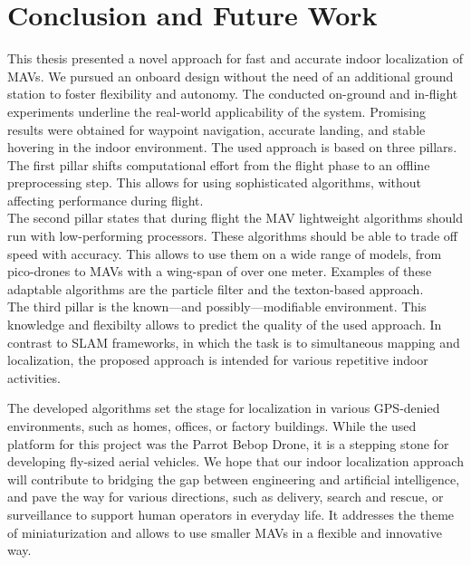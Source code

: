 \chapter{Conclusion and Future Work}
\label{chap:conclusion}

This thesis presented a novel approach for fast and accurate indoor
localization of MAVs. We pursued an onboard design without the need of
an additional ground station to foster flexibility and autonomy. The
conducted on-ground and in-flight experiments underline the real-world
applicability of the system. Promising results were obtained for
waypoint navigation, accurate landing, and stable hovering in the
indoor environment. The
used approach is based on three pillars.\\
The first pillar shifts computational effort from the flight phase to
an offline preprocessing step. This allows for using sophisticated
algorithms, without affecting performance during flight.\\
The second pillar states that during flight the MAV lightweight
algorithms should run with low-performing processors. These algorithms
should be able to trade off speed with accuracy. This allows to use
them on a wide range of models, from pico-drones to MAVs with a
wing-span of over one meter. Examples of these adaptable algorithms
are the particle filter
and the texton-based approach. \\
The third pillar is the known---and possibly---modifiable
environment. This knowledge and flexibilty allows to predict the
quality of the used approach. In contrast to SLAM frameworks, in which
the task is to simultaneous mapping and localization, the proposed
approach is intended for various repetitive indoor activities.

The developed algorithms set the stage for localization in various
GPS-denied environments, such as homes, offices, or factory buildings. While the used platform for this project was the Parrot Bebop Drone,
it is a stepping stone for developing fly-sized aerial vehicles.
We hope that our indoor localization approach will contribute to
bridging the gap between engineering and artificial intelligence, and
pave the way for various directions, such as delivery, search and
rescue, or surveillance to support human operators in everyday
life. It addresses the theme of miniaturization and allows to use
smaller MAVs in a flexible and innovative way.
